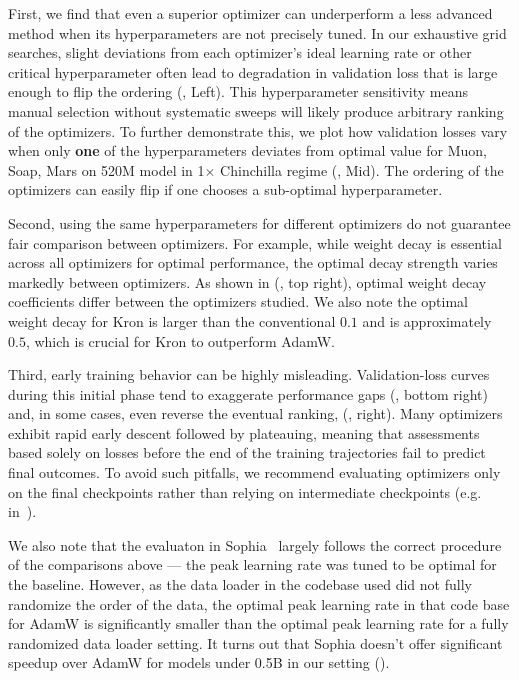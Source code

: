 First, we find that even a superior optimizer can underperform a less advanced method when its hyperparameters are not precisely tuned. In our exhaustive grid searches, slight deviations from each optimizer's ideal learning rate or other critical hyperparameter often lead to degradation in validation loss that is large enough to flip the ordering (, Left). This hyperparameter sensitivity means manual selection without systematic sweeps will likely produce arbitrary ranking of the optimizers. To further demonstrate this, we plot how validation losses vary  when only \textbf{one} of the hyperparameters deviates from optimal value for {Muon}, {Soap}, {Mars} on 520M model in 1$\times$ Chinchilla regime (, Mid). The ordering of the optimizers can easily flip if one chooses a sub-optimal hyperparameter.




Second, using the same hyperparameters for different optimizers do not guarantee fair comparison between optimizers. For example, while weight decay is essential across all optimizers for optimal performance, the optimal decay strength varies markedly between optimizers. As shown in (, top right), optimal weight decay coefficients differ between the optimizers studied. We also note the optimal weight decay for Kron is larger than the conventional $0.1$ and is approximately $0.5$, which is crucial for Kron to outperform AdamW. 

Third, early training behavior can be highly misleading. Validation-loss curves during this initial phase tend to exaggerate performance gaps (, bottom right) and, in some cases, even reverse the eventual ranking, (, right). Many optimizers exhibit rapid early descent followed by plateauing, meaning that assessments based solely on losses before the end of the training  trajectories fail to predict final outcomes. To avoid such pitfalls, we recommend evaluating optimizers only on the final checkpoints rather than relying on intermediate checkpoints (e.g. in~\cite{liu2025muonscalablellmtraining}). 

We also note that the evaluaton in Sophia~\cite{liu2024sophiascalablestochasticsecondorder} largely follows the correct procedure of the comparisons above --- the peak learning rate was tuned to be optimal for the baseline. However, as the data loader in the codebase used did not fully randomize the order of the data, the optimal peak learning rate in that code base for AdamW is significantly smaller than the optimal peak learning rate for a fully randomized data loader setting. It turns out that Sophia doesn't offer significant speedup over AdamW for models under 0.5B in our setting ().

